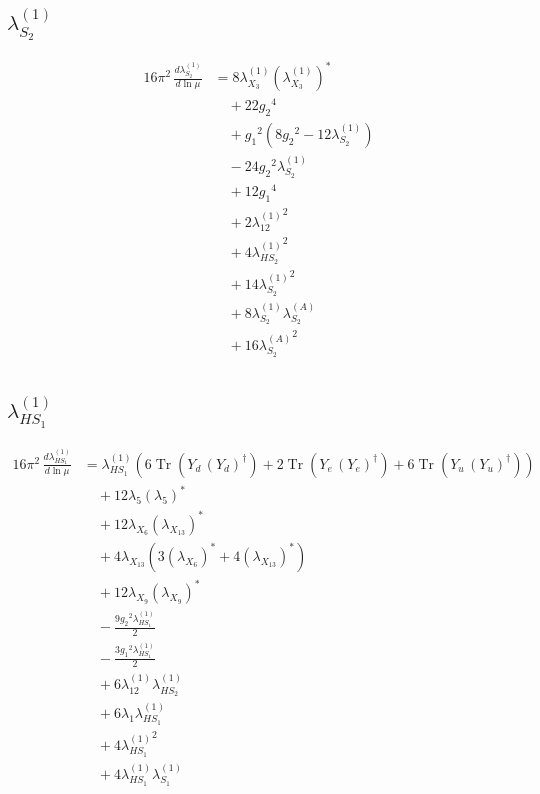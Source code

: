 \documentclass[10pt,a4paper]{article}
\begin{document}
\subsection*{$\lambda_{S_2}^{(1)}$}
\begin{align*}
16\pi^2\,\frac{d \lambda_{S_2}^{(1)}}{d\ln\mu} &=8 {\lambda_{X_{3}}^{(1)}} \left({\lambda_{X_{3}}^{(1)}}\right)^{*} \\
&\quad +22 {g_2}^4 \\
&\quad +{g_1}^2 \left(8 {g_2}^2-12 {\lambda_{S_2}^{(1)}}\right) \\
&\quad -24 {g_2}^2 {\lambda_{S_2}^{(1)}} \\
&\quad +12 {g_1}^4 \\
&\quad +2 {\lambda_{12}^{(1)}}^2 \\
&\quad +4 {\lambda_{HS_2}^{(1)}}^2 \\
&\quad +14 {\lambda_{S_2}^{(1)}}^2 \\
&\quad +8 {\lambda_{S_2}^{(1)}} {\lambda_{S_2}^{(A)}} \\
&\quad +16 {\lambda_{S_2}^{(A)}}^2 \\
\end{align*}
\subsection*{$\lambda_{HS_1}^{(1)}$}
\begin{align*}
16\pi^2\,\frac{d \lambda_{HS_1}^{(1)}}{d\ln\mu} &={\lambda_{HS_1}^{(1)}} (6 \operatorname{Tr}\!\left({Y_d}\,\left({Y_d}\right)^{\dagger}\right)+2 \operatorname{Tr}\!\left({Y_e}\,\left({Y_e}\right)^{\dagger}\right)+6 \operatorname{Tr}\!\left({Y_u}\,\left({Y_u}\right)^{\dagger}\right)) \\
&\quad +12 {\lambda_5} \left({\lambda_5}\right)^{*} \\
&\quad +12 {\lambda_{X_{6}}} \left({\lambda_{X_{13}}}\right)^{*} \\
&\quad +4 {\lambda_{X_{13}}} (3 \left({\lambda_{X_{6}}}\right)^{*}+4 \left({\lambda_{X_{13}}}\right)^{*}) \\
&\quad +12 {\lambda_{X_{9}}} \left({\lambda_{X_{9}}}\right)^{*} \\
&\quad -\frac{9 {g_2}^2 {\lambda_{HS_1}^{(1)}}}{2} \\
&\quad -\frac{3 {g_1}^2 {\lambda_{HS_1}^{(1)}}}{2} \\
&\quad +6 {\lambda_{12}^{(1)}} {\lambda_{HS_2}^{(1)}} \\
&\quad +6 {\lambda_1} {\lambda_{HS_1}^{(1)}} \\
&\quad +4 {\lambda_{HS_1}^{(1)}}^2 \\
&\quad +4 {\lambda_{HS_1}^{(1)}} {\lambda_{S_1}^{(1)}} \\
\end{align*}
\end{document}
